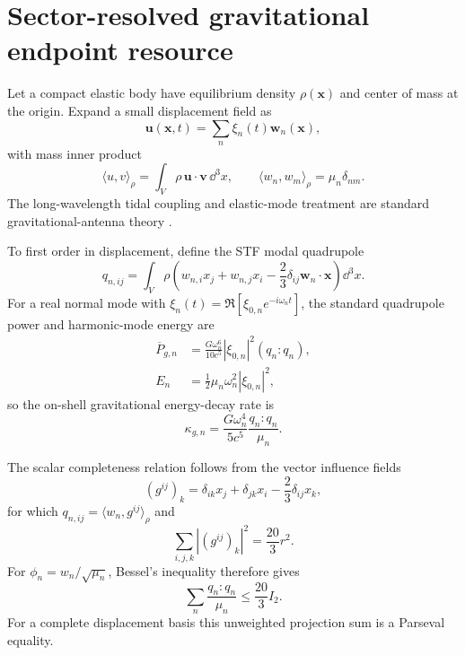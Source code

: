\section{Sector-resolved gravitational endpoint resource}
\label{sec:resource}

Let a compact elastic body have equilibrium density $\rho(\bm x)$ and center of mass at the origin. Expand a small displacement field as
\begin{equation}
\bm u(\bm x,t)=\sum_n \xi_n(t)\bm w_n(\bm x),
\end{equation}
with mass inner product
\begin{equation}
\langle u,v\rangle_\rho=\int_V\rho\,\bm u\cdot\bm v\,\dd^3x,
\qquad
\langle w_n,w_m\rangle_\rho=\mu_n\delta_{nm}.
\end{equation}
The long-wavelength tidal coupling and elastic-mode treatment are standard gravitational-antenna theory \cite{Hirakawa1976,Lobo1995}.

To first order in displacement, define the STF modal quadrupole
\begin{equation}
q_{n,ij}
=\int_V\rho\left(
w_{n,i}x_j+w_{n,j}x_i
-\frac23\delta_{ij}\bm w_n\cdot\bm x
\right)\dd^3x .
\label{eq:qn}
\end{equation}
For a real normal mode with $\xi_n(t)=\Re[\xi_{0,n}e^{-i\omega_nt}]$, the standard quadrupole power and harmonic-mode energy are
\begin{align}
\overline P_{g,n}
&=\frac{G\omega_n^6}{10c^5}|\xi_{0,n}|^2(q_n:q_n),\\
E_n&=\frac12\mu_n\omega_n^2|\xi_{0,n}|^2,
\end{align}
so the on-shell gravitational energy-decay rate is
\begin{equation}
\boxed{
\kappa_{g,n}
=\frac{G\omega_n^4}{5c^5}
\frac{q_n:q_n}{\mu_n}.
}
\label{eq:kappan}
\end{equation}

The scalar completeness relation follows from the vector influence fields
\begin{equation}
(g^{ij})_k
=\delta_{ik}x_j+\delta_{jk}x_i
-\frac23\delta_{ij}x_k,
\end{equation}
for which $q_{n,ij}=\langle w_n,g^{ij}\rangle_\rho$ and
\begin{equation}
\sum_{i,j,k}|(g^{ij})_k|^2=\frac{20}{3}r^2 .
\end{equation}
For $\phi_n=w_n/\sqrt{\mu_n}$, Bessel's inequality therefore gives
\begin{equation}
\boxed{
\sum_n\frac{q_n:q_n}{\mu_n}
\le\frac{20}{3}I_2 .
}
\label{eq:qsum}
\end{equation}
For a complete displacement basis this unweighted projection sum is a Parseval equality.

